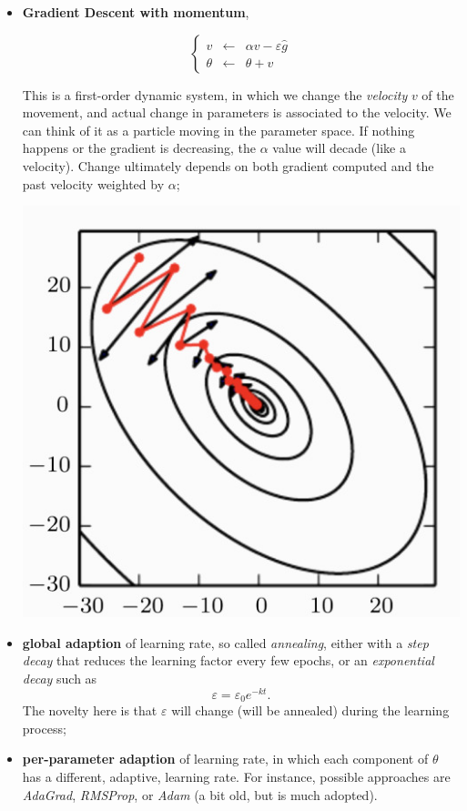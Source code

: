 \documentclass[10pt]{report}
\begin{document}
\begin{itemize}
\item \textbf{Gradient Descent with momentum},

\[\left\{\begin{array}{lll} v & \leftarrow & \alpha v - \varepsilon \hat{g}\\ \theta & \leftarrow & \theta + v \end{array}\right.\]

This is a first-order dynamic system, in which we change the \emph{velocity} \(v\) of the movement, and actual change in parameters is associated to the velocity. We can think of it as a particle moving in the parameter space. If nothing happens or the gradient is decreasing, the \(\alpha\) value will decade (like a velocity). Change ultimately depends on both gradient computed and the past velocity weighted by \(\alpha\);

\begin{center}
\includegraphics[scale=0.4]{./pics/cnn/momentum-gd-comparison.jpg}
\end{center}

\item \textbf{global adaption} of learning rate, so called \emph{annealing}, either with a \emph{step decay} that reduces the learning factor every few epochs, or an \emph{exponential decay} such as \[\varepsilon = \varepsilon_0 e^{-kt}.\] The novelty here is that \(\varepsilon\) will change (will be annealed) during the learning process;
\item \textbf{per-parameter adaption} of learning rate, in which each component of
\(\theta\) has a different, adaptive, learning rate. For instance,
possible approaches are \emph{AdaGrad}, \emph{RMSProp}, or \emph{Adam} (a bit old,
but is much adopted).
\end{itemize}
\end{document}
